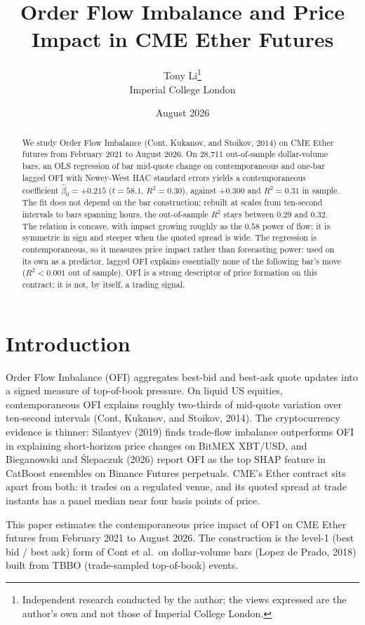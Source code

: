 \documentclass[11pt,a4paper]{article}
\title{\vspace{-3em}\textbf{Order Flow Imbalance and Price Impact in CME Ether Futures}}
\author{Tony Li\thanks{Independent research conducted by the author; the views expressed are the author's own and not those of Imperial College London.}\\ \normalsize Imperial College London}
\date{August 2026}
\begin{document}
\maketitle

\begin{abstract}
\noindent We study Order Flow Imbalance (Cont, Kukanov, and Stoikov, 2014) on CME Ether futures from February 2021 to August 2026. On 28{,}711 out-of-sample dollar-volume bars, an OLS regression of bar mid-quote change on contemporaneous and one-bar lagged OFI with Newey-West HAC standard errors yields a contemporaneous coefficient $\hat{\beta}_0 = +0.215$ ($t = 58.1$, $R^2 = 0.30$), against $+0.300$ and $R^2 = 0.31$ in sample. The fit does not depend on the bar construction: rebuilt at scales from ten-second intervals to bars spanning hours, the out-of-sample $R^2$ stays between $0.29$ and $0.32$. The relation is concave, with impact growing roughly as the $0.58$ power of flow; it is symmetric in sign and steeper when the quoted spread is wide. The regression is contemporaneous, so it measures price impact rather than forecasting power: used on its own as a predictor, lagged OFI explains essentially none of the following bar's move ($R^2 < 0.001$ out of sample). OFI is a strong descriptor of price formation on this contract; it is not, by itself, a trading signal.
\end{abstract}

\section{Introduction}

Order Flow Imbalance (OFI) aggregates best-bid and best-ask quote updates into a signed measure of top-of-book pressure. On liquid US equities, contemporaneous OFI explains roughly two-thirds of mid-quote variation over ten-second intervals (Cont, Kukanov, and Stoikov, 2014). The cryptocurrency evidence is thinner: Silantyev (2019) finds trade-flow imbalance outperforms OFI in explaining short-horizon price changes on BitMEX XBT/USD, and Bieganowski and Ślepaczuk (2026) report OFI as the top SHAP feature in CatBoost ensembles on Binance Futures perpetuals. CME's Ether contract sits apart from both: it trades on a regulated venue, and its quoted spread at trade instants has a panel median near four basis points of price.

This paper estimates the contemporaneous price impact of OFI on CME Ether futures from February 2021 to August 2026. The construction is the level-1 (best bid / best ask) form of Cont et al.\ on dollar-volume bars (Lopez de Prado, 2018) built from TBBO (trade-sampled top-of-book) events.
\end{document}
